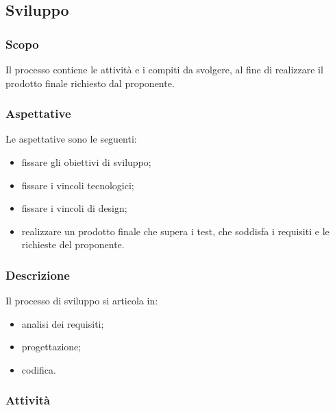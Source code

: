      
\subsection{Sviluppo}

	\subsubsection{Scopo}
	Il processo contiene le attività e i compiti da svolgere, al fine di realizzare 
	il prodotto finale richiesto dal proponente.
	
	\subsubsection{Aspettative}
	Le aspettative sono le seguenti:
		\begin{itemize}
			\item fissare gli obiettivi di sviluppo;
			\item fissare i vincoli tecnologici;
			\item fissare i vincoli di design;
			\item realizzare un prodotto finale che supera i test, che soddisfa i 
				requisiti e le richieste del proponente.
		\end{itemize}
		
	\subsubsection{Descrizione}
	Il processo di sviluppo si articola in:
		\begin{itemize}
			\item analisi dei requisiti;
			\item progettazione;
			\item codifica.
		\end{itemize}
		
	\subsubsection{Attività}
